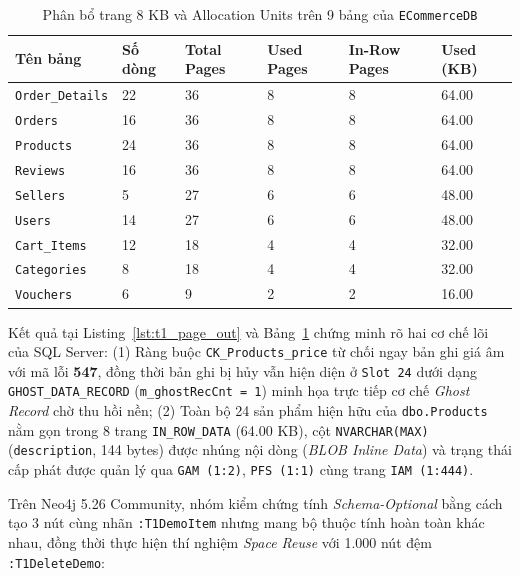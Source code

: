 \begin{table}[htbp]
  \centering
  \footnotesize
  \setlength{\tabcolsep}{4pt}
  \renewcommand{\arraystretch}{1.25}
  \caption{Phân bổ trang 8 KB và Allocation Units trên 9 bảng của \texttt{ECommerceDB}}
  \label{tab:t1_ecommercedb_pages}
  \begin{tabular}{|p{3.0cm}|p{1.5cm}|p{2.1cm}|p{2.1cm}|p{2.1cm}|p{2.1cm}|}
    \hline
    \textbf{Tên bảng} & \textbf{Số dòng} & \textbf{Total Pages} & \textbf{Used Pages} & \textbf{In-Row Pages} & \textbf{Used (KB)} \\
    \hline
    \texttt{Order\_Details} & 22 & 36 & 8 & 8 & 64.00 \\ \hline
    \texttt{Orders}         & 16 & 36 & 8 & 8 & 64.00 \\ \hline
    \texttt{Products}       & 24 & 36 & 8 & 8 & 64.00 \\ \hline
    \texttt{Reviews}        & 16 & 36 & 8 & 8 & 64.00 \\ \hline
    \texttt{Sellers}        &  5 & 27 & 6 & 6 & 48.00 \\ \hline
    \texttt{Users}          & 14 & 27 & 6 & 6 & 48.00 \\ \hline
    \texttt{Cart\_Items}    & 12 & 18 & 4 & 4 & 32.00 \\ \hline
    \texttt{Categories}     &  8 & 18 & 4 & 4 & 32.00 \\ \hline
    \texttt{Vouchers}       &  6 &  9 & 2 & 2 & 16.00 \\ \hline
  \end{tabular}
\end{table}

Kết quả tại Listing~\ref{lst:t1_page_out} và Bảng~\ref{tab:t1_ecommercedb_pages} chứng minh rõ hai cơ chế lõi của SQL Server: (1) Ràng buộc \texttt{CK\_Products\_price} từ chối ngay bản ghi giá âm với mã lỗi \textbf{547}, đồng thời bản ghi bị hủy vẫn hiện diện ở \texttt{Slot 24} dưới dạng \texttt{GHOST\_DATA\_RECORD} (\texttt{m\_ghostRecCnt = 1}) minh họa trực tiếp cơ chế \textit{Ghost Record} chờ thu hồi nền; (2) Toàn bộ 24 sản phẩm hiện hữu của \texttt{dbo.Products} nằm gọn trong 8 trang \texttt{IN\_ROW\_DATA} (64.00 KB), cột \texttt{NVARCHAR(MAX)} (\texttt{description}, 144 bytes) được nhúng nội dòng (\textit{BLOB Inline Data}) và trạng thái cấp phát được quản lý qua \texttt{GAM (1:2)}, \texttt{PFS (1:1)} cùng trang \texttt{IAM (1:444)}.

Trên Neo4j 5.26 Community, nhóm kiểm chứng tính \textit{Schema-Optional} bằng cách tạo 3 nút cùng nhãn \texttt{:T1DemoItem} nhưng mang bộ thuộc tính hoàn toàn khác nhau, đồng thời thực hiện thí nghiệm \textit{Space Reuse} với 1.000 nút đệm \texttt{:T1DeleteDemo}:

